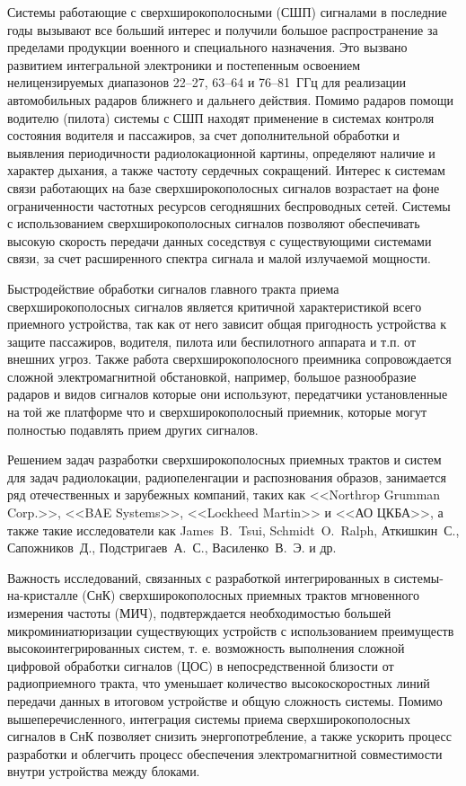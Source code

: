 
{\actuality} Системы работающие с сверхширокополосными (СШП) сигналами в последние годы вызывают все больший интерес и получили большое распространение за пределами продукции военного и специального назначения. Это вызвано развитием интегральной электроники и постепенным освоением нелицензируемых диапазонов \numrange[]{22}{27}, \numrange[]{63}{64} и \numrange[]{76}{81}~ГГц для реализации автомобильных радаров ближнего и дальнего действия. Помимо радаров помощи водителю (пилота) системы с СШП находят применение в системах контроля состояния водителя и пассажиров, за счет дополнительной обработки и выявления периодичности радиолокационной картины, определяют наличие и характер дыхания, а также частоту сердечных сокращений. Интерес к системам связи работающих на базе сверхширокополосных сигналов возрастает на фоне ограниченности частотных ресурсов сегодняшних беспроводных сетей. Системы с использованием сверхширокополосных сигналов позволяют обеспечивать высокую скорость передачи данных соседствуя с существующими системами связи, за счет расширенного спектра сигнала и малой излучаемой мощности. 

Быстродействие обработки сигналов главного тракта приема сверхширокополосных сигналов является критичной характеристикой всего приемного устройства, так как от него зависит общая пригодность устройства к защите пассажиров, водителя, пилота или беспилотного аппарата и т.п. от внешних угроз. Также работа сверхширокополосного преимника сопровождается сложной электромагнитной обстановкой, например, большое разнообразие радаров и видов сигналов которые они используют, передатчики установленные на той же платформе что и сверхширокополосный приемник, которые могут полностью подавлять прием других сигналов.

Решением задач разработки сверхширокополосных приемных трактов и систем для задач радиолокации, радиопеленгации и распознования образов, занимается ряд отечественных и зарубежных компаний, таких как  <<Northrop Grumman Corp.>>, <<BAE Systems>>, <<Lockheed Martin>> и <<АО ЦКБА>>, а также такие исследователи как James~B.~Tsui, Schmidt~O.~Ralph, Аткишкин~С., Сапожников~Д., Подстригаев~А.~С., Василенко~В.~Э. и др.

Важность исследований, связанных с разработкой интегрированных в системы-на-кристалле (СнК) сверхширокополосных приемных трактов мгновенного измерения частоты (МИЧ), подвтерждается необходимостью большей микроминиатюризации существующих устройств с использованием преимуществ высокоинтегрированных систем, т. е. возможность выполнения сложной цифровой обработки сигналов (ЦОС) в непосредственной близости от радиоприемного тракта, что уменьшает количество высокоскоростных линий передачи данных в итоговом устройстве и общую сложность системы. Помимо вышеперечисленного, интеграция системы приема сверхширокополосных сигналов в СнК позволяет снизить энергопотребление, а также ускорить процесс разработки и облегчить процесс обеспечения электромагнитной совместимости внутри устройства между блоками.

